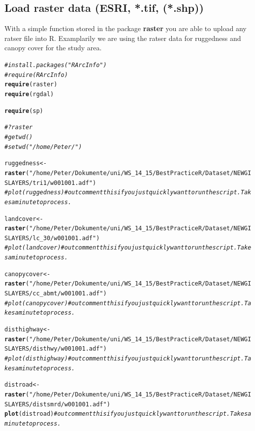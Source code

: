 \documentclass[11pt, a4paper]{article}\usepackage[]{graphicx}\usepackage[]{color}
\makeatletter
\newcommand{\hlstr}[1]{\textcolor[rgb]{0.192,0.494,0.8}{#1}}%
\newcommand{\hlcom}[1]{\textcolor[rgb]{0.678,0.584,0.686}{\textit{#1}}}%
\newcommand{\hlstd}[1]{\textcolor[rgb]{0.345,0.345,0.345}{#1}}%
\newcommand{\hlkwb}[1]{\textcolor[rgb]{0.69,0.353,0.396}{#1}}%
\newcommand{\hlkwd}[1]{\textcolor[rgb]{0.737,0.353,0.396}{\textbf{#1}}}%
\newenvironment{kframe}{%
 \def\at@end@of@kframe{}%
 \ifinner\ifhmode%
  \def\at@end@of@kframe{\end{minipage}}%
  \begin{minipage}{\columnwidth}%
 \fi\fi%
 \def\FrameCommand##1{\hskip\@totalleftmargin \hskip-\fboxsep
 \colorbox{shadecolor}{##1}\hskip-\fboxsep
     \hskip-\linewidth \hskip-\@totalleftmargin \hskip\columnwidth}%
 \MakeFramed {\advance\hsize-\width
   \@totalleftmargin\z@ \linewidth\hsize
   \@setminipage}}%
 {\par\unskip\endMakeFramed%
 \at@end@of@kframe}
\newenvironment{knitrout}{}{} %
\makeatother
\begin{document}
\subsection{Load raster data (ESRI, *.tif, (*.shp))}%
With a simple function stored in the package \textbf{raster} you are able to upload any ratser file into R. Examplarily we are using the ratser data for ruggedness and canopy cover for the study area.  


\begin{knitrout}
\color{fgcolor}\begin{kframe}
\begin{alltt}
\hlcom{#install.packages("RArcInfo")}
\hlcom{#require(RArcInfo)}
\hlkwd{require}\hlstd{(raster)}
\hlkwd{require}\hlstd{(rgdal)}

\hlkwd{require}\hlstd{(sp)}


\hlcom{#?raster}
\hlcom{#getwd()}
\hlcom{#setwd("/home/Peter/")}

\hlstd{ruggedness} \hlkwb{<-} \hlkwd{raster}\hlstd{(}\hlstr{"/home/Peter/Dokumente/uni/WS_14_15/Best Practice R/Dataset/NEW GIS LAYERS/tri1/w001001.adf"}\hlstd{)}
\hlcom{# plot(ruggedness) # outcomment this if you just quickly want to run the script. Takes a minute to process.}

\hlstd{landcover} \hlkwb{<-} \hlkwd{raster}\hlstd{(}\hlstr{"/home/Peter/Dokumente/uni/WS_14_15/Best Practice R/Dataset/NEW GIS LAYERS/lc_30/w001001.adf"}\hlstd{)}
\hlcom{# plot(landcover) # outcomment this if you just quickly want to run the script. Takes a minute to process.}

\hlstd{canopycover} \hlkwb{<-} \hlkwd{raster}\hlstd{(}\hlstr{"/home/Peter/Dokumente/uni/WS_14_15/Best Practice R/Dataset/NEW GIS LAYERS/cc_abmt/w001001.adf"}\hlstd{)}
\hlcom{# plot(canopycover) # outcomment this if you just quickly want to run the script. Takes a minute to process.}

\hlstd{disthighway} \hlkwb{<-} \hlkwd{raster}\hlstd{(}\hlstr{"/home/Peter/Dokumente/uni/WS_14_15/Best Practice R/Dataset/NEW GIS LAYERS/disthwy/w001001.adf"}\hlstd{)}
\hlcom{# plot(disthighway) # outcomment this if you just quickly want to run the script. Takes a minute to process.}

\hlstd{distroad} \hlkwb{<-} \hlkwd{raster}\hlstd{(}\hlstr{"/home/Peter/Dokumente/uni/WS_14_15/Best Practice R/Dataset/NEW GIS LAYERS/distsmrd/w001001.adf"}\hlstd{)}
\hlkwd{plot}\hlstd{(distroad)} \hlcom{# outcomment this if you just quickly want to run the script. Takes a minute to process.}
\end{alltt}
\end{kframe}
\end{knitrout}
\end{document}
